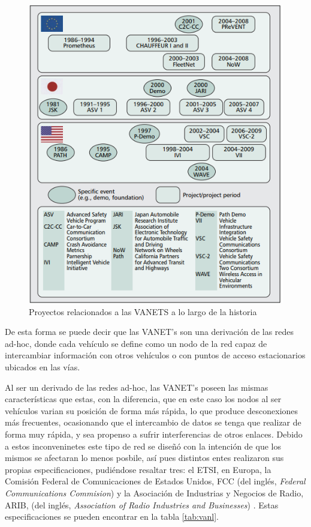 \begin{figure}[!h]
	\centering
		\includegraphics[scale=0.9]{Imagenes/vaneth1}
		\caption{Proyectos relacionados a las VANETS a lo largo de la historia \cite{hartenstein2008tutorial}}
		\label{fig:vaneth}
	\end{figure}	

\par De esta forma se puede decir que las VANET's son una derivación de las redes ad-hoc, donde cada vehículo se define como un nodo de la red capaz de intercambiar información con otros vehículos o con puntos de acceso estacionarios ubicados en las vías.\\

\par Al ser un derivado de las redes ad-hoc, las VANET's poseen las mismas características que estas, con la diferencia, que en este caso los nodos al ser vehículos varian su posición de forma más rápida, lo que produce desconexiones más frecuentes, ocasionando que el intercambio de datos se tenga que realizar de forma muy rápida, y sea propenso a sufrir interferencias de otros enlaces. Debido a estos inconveninetes este tipo de red se diseñó con la intención de que los mismos se afectaran lo menos posbile, así pues distintos entes realizaron sus propias especificaciones, pudiéndose resaltar tres: el ETSI, en Europa, la Comisión Federal de Comunicaciones de Estados Unidos, FCC (del inglés, \textit{Federal Communications Commision}) y la Asociación de Industrias y Negocios de Radio, ARIB, (del inglés, \textit{Association of Radio Industries and Businesses}) \cite{zeadally2012vehicular}. Estas especificaciones se pueden encontrar en la tabla \ref{tab:vanl}.\\

